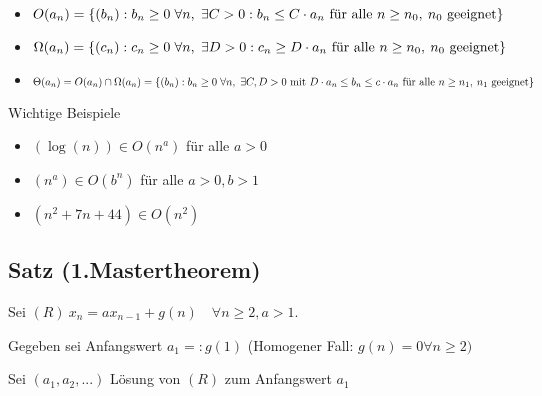 \begin{itemize}
	
	\item $O(a_n) = \aset{(b_n) : b_n \geq 0 \forall n, \exists C > 0 : b_n \leq C \cdot a_n \text{ für alle } n \geq n_0,\: n_0 \text{ geeignet} }$
	
	\item
	$\Omega(a_n) = \aset{ (c_n) : c_n \geq 0 \forall n, \exists  D>0 : c_n \geq D \cdot a_n \text{ für alle } n \geq n_0,\: n_0 \text{ geeignet}  }  $
	
	\item
	$\Theta(a_n) = O(a_n) \cap \Omega(a_n)
	\\ = \aset{(b_n) : b_n \geq 0 \forall n, \exists C, D>0 \text{ mit } D \cdot a_n \leq b_n \leq c \cdot a_n  \text{ für alle } n \geq n_1,\: n_1 \text{ geeignet}  }
	$
	
	
\end{itemize}

Wichtige Beispiele

\begin{itemize}
	\item 	$(\log (n)) \in O(n^a)$ für alle $a > 0$ 
	
	\item $(n^a) \in O(b^n)$ für alle $a > 0, b > 1$
	
	\item $(n^2 + 7n + 44) \in O(n^2)$	
\end{itemize}


\subsection{Satz (1.Mastertheorem)}

Sei $(R) ~ x_n = ax_{n-1}+g(n) \quad \forall n \geq 2, a>1$.

Gegeben sei Anfangswert $a_1 =: g(1)$ (Homogener Fall: $ g(n) = 0 \forall n \geq 2)$

Sei $(a_1,a_2,...)$ Lösung von $(R)$ zum Anfangswert $a_1$


